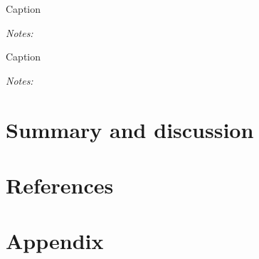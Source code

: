 \documentclass[final, dvipsnames, authoryear,12pt]{elsarticle}
\begin{document}
\begin{table}[H]
    \caption{Caption}
    \label{tab:my_label}
    \centerline{}
    {\scriptsize \textit{Notes:}}
\end{table}

\begin{table}[H]
    \caption{Caption}
    \label{tab:my_label}
    \centerline{}
    {\scriptsize \textit{Notes:}}
\end{table}


\pagebreak
\newpage

\section{Summary and discussion}




\section{References}




\section{Appendix}
\end{document}
